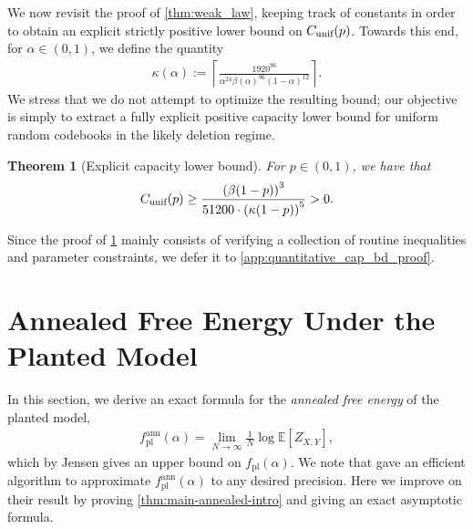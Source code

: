 \documentclass[11pt]{amsart}
\numberwithin{equation}{section}
\numberwithin{equation}{section}
\newcommand{\1}{\mathbbm{1}}
\newcommand{\E}{\mathbb{E}}
\newcommand{\unif}{\textup{unif}}
\newcommand{\fpl}{f_{\mathrm{pl}}}
\newcommand{\fplann}{f_{\mathrm{pl}}^{\mathrm{ann}}}
\newtheorem{theorem}{Theorem}[section]
\theoremstyle{definition}
\begin{document}
We now revisit the proof of \cref{thm:weak_law}, keeping track of constants in order to obtain an explicit strictly positive lower bound on $C_{\unif}(p)$. Towards this end, for $\alpha \in (0,1)$, we define the quantity
\begin{align*}
    \kappa(\alpha) := \left\lceil \frac{1920^{96}}{\alpha^{24} \beta(\alpha)^{96} (1-\alpha)^{12}} \right\rceil.
\end{align*}
We stress that we do not attempt to optimize the resulting bound; our objective is simply to extract a fully explicit positive capacity lower bound for uniform random codebooks in the likely deletion regime.
\begin{theorem}[Explicit capacity lower bound] \label{thm:quantitative_capacity_bound}
    For $p \in (0, 1)$, we have that
    \begin{align*}
        C_{\unif}(p) \geq \frac{\left( \beta(1-p) \right)^3}{51200 \cdot \left( \kappa(1-p) \right)^5} > 0.
    \end{align*}
\end{theorem}
Since the proof of \cref{thm:quantitative_capacity_bound} mainly consists of verifying a collection of routine inequalities and parameter constraints, we defer it to \cref{app:quantitative_cap_bd_proof}.

\section{Annealed Free Energy Under the Planted Model} \label{sec:annealed_free_planted}

In this section, we derive an exact formula for the \emph{annealed free energy} of the planted model,
\begin{align*}
    \fplann(\alpha) = \lim_{N\to\infty}\frac{1}{N} \log \E \left[ Z_{X, Y} \right],
\end{align*}
which by Jensen gives an upper bound on $\fpl(\alpha)$. We note that \cite{pernice2024mutual} gave an efficient algorithm to approximate $\fplann(\alpha)$ to any desired precision. Here we improve on their result by proving \cref{thm:main-annealed-intro} and giving an exact asymptotic formula.
\end{document}
